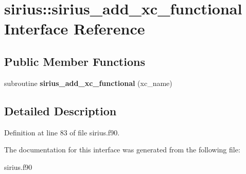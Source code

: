 \hypertarget{interfacesirius_1_1sirius__add__xc__functional}{}\section{sirius\+:\+:sirius\+\_\+add\+\_\+xc\+\_\+functional Interface Reference}
\label{interfacesirius_1_1sirius__add__xc__functional}
\subsection*{Public Member Functions}
\begin{DoxyCompactItemize}
\item 
\hypertarget{interfacesirius_1_1sirius__add__xc__functional_a5fd7fe54ff6ce2c8946dc17c49764f20}{}subroutine {\bfseries sirius\+\_\+add\+\_\+xc\+\_\+functional} (xc\+\_\+name)\label{interfacesirius_1_1sirius__add__xc__functional_a5fd7fe54ff6ce2c8946dc17c49764f20}

\end{DoxyCompactItemize}


\subsection{Detailed Description}


Definition at line 83 of file sirius.\+f90.



The documentation for this interface was generated from the following file\+:\begin{DoxyCompactItemize}
\item 
sirius.\+f90\end{DoxyCompactItemize}
